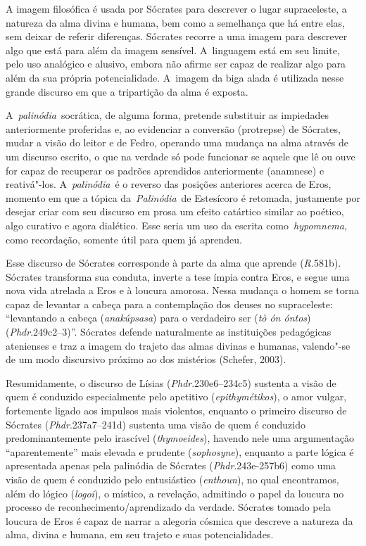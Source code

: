 A imagem filosófica é usada por Sócrates para descrever o lugar
supraceleste, a natureza da alma divina e humana, bem como a semelhança
que há entre elas, sem deixar de referir diferenças. Sócrates recorre a
uma imagem para descrever algo que está para além da imagem sensível. A~linguagem está em seu limite, pelo uso analógico e alusivo, embora não
afirme ser capaz de realizar algo para além da sua própria
potencialidade. A~imagem da biga alada é utilizada nesse grande discurso
em que a tripartição da alma é exposta.

A~\emph{palinódia}~socrática, de alguma forma, pretende substituir as
impiedades anteriormente proferidas e, ao evidenciar a conversão
(protrepse) de Sócrates, mudar a visão do leitor e de Fedro, operando
uma mudança na alma através de um discurso escrito, o que na verdade só
pode funcionar se aquele que lê ou ouve for capaz de recuperar os
padrões aprendidos anteriormente (anamnese) e reativá"-los.
A~\emph{palinódia}~é o reverso das posições anteriores acerca de Eros,
momento em que a tópica da~\emph{Palinódia}~de Estesícoro é retomada,
justamente por desejar criar com seu discurso em prosa um efeito
catártico similar ao poético, algo curativo e agora dialético. Esse
seria um uso da escrita como~\emph{hypomnema}, como recordação, somente
útil para quem já aprendeu.

Esse discurso de Sócrates corresponde à parte da alma que aprende
(\emph{R.}581b). Sócrates transforma sua conduta, inverte a tese ímpia
contra Eros, e segue uma nova vida atrelada a Eros e à loucura amorosa.
Nessa mudança o homem se torna capaz de levantar a cabeça para a
contemplação dos deuses no supraceleste: ``levantando a cabeça
(\emph{anakúpsasa}) para o verdadeiro ser (\emph{tò ón óntos})
(\emph{Phdr}.249c2--3)''. Sócrates defende naturalmente as instituições
pedagógicas atenienses e traz a imagem do trajeto das almas divinas e
humanas, valendo"-se de um modo discursivo próximo ao dos mistérios
(Schefer, 2003).

 

\asterisc{}

 

Resumidamente, o discurso de Lísias (\emph{Phdr}.230e6--234c5) sustenta
a visão de quem é conduzido especialmente pelo apetitivo
(\emph{epithymétikos}), o amor vulgar, fortemente ligado aos impulsos
mais violentos, enquanto o primeiro discurso de Sócrates
(\emph{Phdr}.237a7--241d) sustenta uma visão de quem é conduzido
predominantemente pelo irascível (\emph{thymoeides}), havendo nele uma
argumentação ``aparentemente'' mais elevada e prudente
(\emph{sophosyne}), enquanto a parte lógica é apresentada apenas pela
palinódia de Sócrates (\emph{Phdr}.243e-257b6) como uma visão de quem é
conduzido pelo entusiástico (\emph{enthoun}), no qual encontramos, além
do lógico (\emph{logoi}), o místico, a revelação, admitindo o papel da
loucura no processo de reconhecimento/\allowbreak{}aprendizado da verdade. Sócrates
tomado pela loucura de Eros é capaz de narrar a alegoria cósmica que
descreve a natureza da alma, divina e humana, em seu trajeto e suas
potencialidades.

